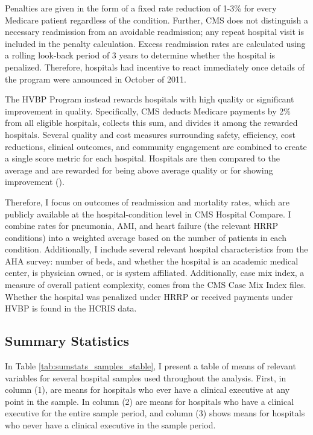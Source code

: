 \documentclass[12pt]{article}
\begin{document}
    Penalties are given in the form of a fixed rate reduction of 1-3\% for every Medicare patient regardless of the condition. Further, CMS does not distinguish a necessary readmission from an avoidable readmission; any repeat hospital visit is included in the penalty calculation. Excess readmission rates are calculated using a rolling look-back period of 3 years to determine whether the hospital is penalized. Therefore, hospitals had incentive to react immediately once details of the program were announced in October of 2011. 

    The HVBP Program instead rewards hospitals with high quality or significant improvement in quality. Specifically, CMS deducts Medicare payments by 2\% from all eligible hospitals, collects this sum, and divides it among the rewarded hospitals. Several quality and cost measures surrounding safety, efficiency, cost reductions, clinical outcomes, and community engagement are combined to create a single score metric for each hospital. Hospitals are then compared to the average and are rewarded for being above average quality or for showing improvement (\cite{CMS_2023}). 

    Therefore, I focus on outcomes of readmission and mortality rates, which are publicly available at the hospital-condition level in CMS Hospital Compare. I combine rates for pneumonia, AMI, and heart failure (the relevant HRRP conditions) into a weighted average based on the number of patients in each condition. Additionally, I include several relevant hospital characteristics from the AHA survey: number of beds, and whether the hospital is an academic medical center, is physician owned, or is system affiliated. Additionally, case mix index, a measure of overall patient complexity, comes from the CMS Case Mix Index files. Whether the hospital was penalized under HRRP or received payments under HVBP is found in the HCRIS data. 

	\subsection{Summary Statistics}\label{sec:data}

    In Table \ref{tab:sumstats_samples_stable}, I present a table of means of relevant variables for several hospital samples used throughout the analysis. First, in column (1), are means for hospitals who ever have a clinical executive at any point in the sample. In column (2) are means for hospitals who have a clinical executive for the entire sample period, and column (3) shows means for hospitals who never have a clinical executive in the sample period. 
\end{document}

